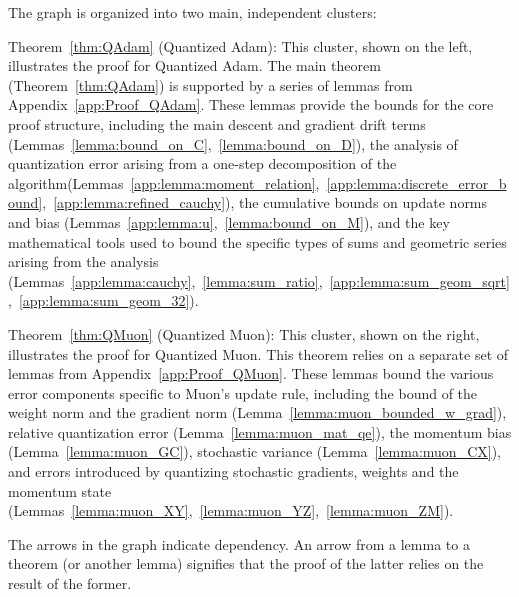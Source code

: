 \documentclass[11pt, letterpaper]{article}
\begin{document}
The graph is organized into two main, independent clusters:

Theorem~\ref{thm:QAdam} (Quantized Adam): This cluster, shown on the left, illustrates the proof for Quantized Adam. The main theorem (Theorem~\ref{thm:QAdam}) is supported by a series of lemmas from Appendix~\ref{app:Proof_QAdam}. These lemmas provide the bounds for the core proof structure, including the main descent and gradient drift terms (Lemmas~\ref{lemma:bound_on_C},~\ref{lemma:bound_on_D}), the analysis of quantization error arising from a one-step decomposition of the algorithm(Lemmas~\ref{app:lemma:moment_relation},~\ref{app:lemma:discrete_error_bound},~\ref{app:lemma:refined_cauchy}), the cumulative bounds on update norms and bias (Lemmas~\ref{app:lemma:u},~\ref{lemma:bound_on_M}), and the key mathematical tools used to bound the specific types of sums and geometric series arising from the analysis (Lemmas~\ref{app:lemma:cauchy},~\ref{lemma:sum_ratio},~\ref{app:lemma:sum_geom_sqrt},~\ref{app:lemma:sum_geom_32}).


Theorem~\ref{thm:QMuon} (Quantized Muon): This cluster, shown on the right, illustrates the proof for Quantized Muon. This theorem relies on a separate set of lemmas from Appendix~\ref{app:Proof_QMuon}. These lemmas bound the various error components specific to Muon's update rule, including the bound of the weight norm and the gradient norm (Lemma~\ref{lemma:muon_bounded_w_grad}), relative quantization error (Lemma~\ref{lemma:muon_mat_qe}), the momentum bias (Lemma~\ref{lemma:muon_GC}), stochastic variance (Lemma~\ref{lemma:muon_CX}), and errors introduced by quantizing stochastic gradients, weights and the momentum state (Lemmas~\ref{lemma:muon_XY},~\ref{lemma:muon_YZ},~\ref{lemma:muon_ZM}).

The arrows in the graph indicate dependency. An arrow from a lemma to a theorem (or another lemma) signifies that the proof of the latter relies on the result of the former.
\end{document}
